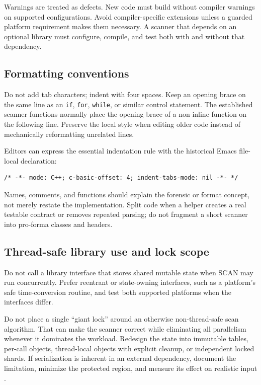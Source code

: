 \documentclass[11pt]{article}
\newcommand{\code}[1]{\texttt{#1}}
\begin{document}
Warnings are treated as defects. New code must build without compiler warnings
on supported configurations. Avoid compiler-specific extensions unless a
guarded platform requirement makes them necessary. A scanner that depends on
an optional library must configure, compile, and test both with and without
that dependency.

\subsection{Formatting conventions}

Do not add tab characters; indent with four spaces. Keep an opening brace on
the same line as an \code{if}, \code{for}, \code{while}, or similar control
statement. The established scanner functions normally place the opening brace
of a non-inline function on the following line. Preserve the local style when
editing older code instead of mechanically reformatting unrelated lines.

Editors can express the essential indentation rule with the historical Emacs
file-local declaration:

\begin{Verbatim}[fontsize=\small]
/* -*- mode: C++; c-basic-offset: 4; indent-tabs-mode: nil -*- */
\end{Verbatim}

Names, comments, and functions should explain the forensic or format concept,
not merely restate the implementation. Split code when a helper creates a real
testable contract or removes repeated parsing; do not fragment a short scanner
into pro-forma classes and headers.

\subsection{Thread-safe library use and lock scope}

Do not call a library interface that stores shared mutable state when SCAN may
run concurrently. Prefer reentrant or state-owning interfaces, such as a
platform's safe time-conversion routine, and test both supported platforms when
the interfaces differ.

Do not place a single ``giant lock'' around an otherwise non-thread-safe scan
algorithm. That can make the scanner correct while eliminating all parallelism
whenever it dominates the workload. Redesign the state into immutable tables,
per-call objects, thread-local objects with explicit cleanup, or independent
locked shards. If serialization is inherent in an external dependency,
document the limitation, minimize the protected region, and measure its effect
on realistic input \cite{programmerstex}.
\end{document}
